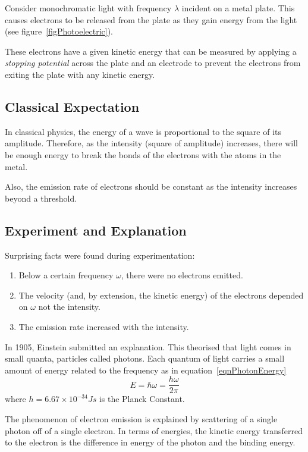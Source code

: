 \documentclass[../Main.tex]{subfiles}
\begin{document}
Consider monochromatic light with frequency $\lambda$ incident on a metal plate. This causes electrons to be released from the plate as they gain energy from the light (see figure~\ref{figPhotoelectric}).

These electrons have a given kinetic energy that can be measured by applying a \textit{stopping potential} across the plate and an electrode to prevent the electrons from exiting the plate with any kinetic energy.
\subsection{Classical Expectation}
In classical physics, the energy of a wave is proportional to the square of its amplitude. Therefore, as the intensity (square of amplitude) increases, there will be enough energy to break the bonds of the electrons with the atoms in the metal.

Also, the emission rate of electrons should be constant as the intensity increases beyond a threshold.
\subsection{Experiment and Explanation}
Surprising facts were found during experimentation:
\begin{enumerate}
    \item Below a certain frequency $\omega$, there were no electrons emitted. \label{PEFinding1}
    \item The velocity (and, by extension, the kinetic energy) of the electrons depended on $\omega$ not the intensity.\label{PEFinding2}
    \item The emission rate increased with the intensity.\label{PEFinding3}
\end{enumerate}
In 1905, Einstein submitted an explanation. This theorised that light comes in small quanta, particles called photons. Each quantum of light carries a small amount of energy related to the frequency as in equation~\ref{eqnPhotonEnergy}
\begin{equation}
    E = \hbar \omega = \frac{h \omega}{2\pi}
    \label{eqnPhotonEnergy}
\end{equation}
where $h = 6.67\times 10^{-34} J s$ is the Planck Constant.

The phenomenon of electron emission is explained by scattering of a single photon off of a single electron. In terms of energies, the kinetic energy transferred to the electron is the difference in energy of the photon and the binding energy.
\end{document}
